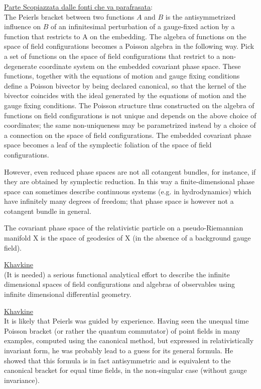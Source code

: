 \documentclass[Cascione]{subfiles}
\begin{document}
		\begin{Warning}
			\underline{Parte Scopiazzata dalle fonti che va parafrasata}:\\
			The Peierls bracket between two functions $A$ and $B$ is the antisymmetrized influence on $B$ of an infinitesimal perturbation of a gauge-fixed action by a function that restricts to A on the embedding. 
			The algebra of functions on the space of field configurations becomes a Poisson algebra in the following way. Pick a set of functions on the space of field configurations that restrict to a non-degenerate coordinate system on the embedded covariant phase space.
			These functions, together with the equations of motion and gauge fixing conditions define a Poisson bivector by being declared canonical, so that the kernel of the bivector coincides with the ideal generated by the equations of motion and the gauge fixing conditions.
			The Poisson structure thus constructed on the algebra of functions on field configurations is not unique and depends on the above choice of coordinates; the same non-uniqueness may be parametrized instead by a choice of a connection on the space of field configurations.
			The embedded covariant phase space becomes a leaf of the symplectic foliation of the space of field configurations.

			However, even reduced phase spaces are not all cotangent bundles, for instance, if they are obtained by symplectic reduction.
			In this way a finite-dimensional phase space can sometimes describe continuous systems (e.g. in hydrodynamics) which have infinitely many degrees of freedom; that phase space is however not a cotangent bundle in general.
		\end{Warning}

		\begin{example}
			The covariant phase space of the relativistic particle on a pseudo-Riemannian manifold X is the space of geodesics of X (in the absence of a background gauge field).
		\end{example}

		\begin{Warning}
			\underline{Khavkine}\cite{Khavkine2014}\\
			(It is needed) a serious functional analytical effort to describe the infinite dimensional spaces of field configurations and algebras of observables using infinite dimensional differential geometry.
		\end{Warning}				

		\begin{Warning}
			\underline{Khavkine}\cite{Khavkine2014}\\
			It is likely that Peierls was guided by experience. Having seen the unequal time Poisson bracket (or rather the quantum commutator) of point fields in many examples, computed using the canonical method, but expressed in relativistically invariant form, he was probably lead to a guess for its general formula. 
			He showed that this formula is in fact antisymmetric and is equivalent to the canonical bracket for equal time fields, in the non-singular case (without gauge invariance). 
		\end{Warning}		
	
\end{document}
